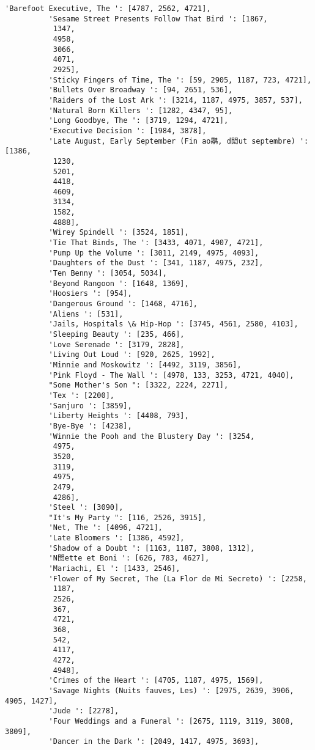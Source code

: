 \documentclass[11pt]{article}
\begin{document}
\begin{Verbatim}[commandchars=\\\{\}]
          'Barefoot Executive, The ': [4787, 2562, 4721],
          'Sesame Street Presents Follow That Bird ': [1867,
           1347,
           4958,
           3066,
           4071,
           2925],
          'Sticky Fingers of Time, The ': [59, 2905, 1187, 723, 4721],
          'Bullets Over Broadway ': [94, 2651, 536],
          'Raiders of the Lost Ark ': [3214, 1187, 4975, 3857, 537],
          'Natural Born Killers ': [1282, 4347, 95],
          'Long Goodbye, The ': [3719, 1294, 4721],
          'Executive Decision ': [1984, 3878],
          'Late August, Early September (Fin ao鹴, d閎ut septembre) ': [1386,
           1230,
           5201,
           4418,
           4609,
           3134,
           1582,
           4888],
          'Wirey Spindell ': [3524, 1851],
          'Tie That Binds, The ': [3433, 4071, 4907, 4721],
          'Pump Up the Volume ': [3011, 2149, 4975, 4093],
          'Daughters of the Dust ': [341, 1187, 4975, 232],
          'Ten Benny ': [3054, 5034],
          'Beyond Rangoon ': [1648, 1369],
          'Hoosiers ': [954],
          'Dangerous Ground ': [1468, 4716],
          'Aliens ': [531],
          'Jails, Hospitals \& Hip-Hop ': [3745, 4561, 2580, 4103],
          'Sleeping Beauty ': [235, 466],
          'Love Serenade ': [3179, 2828],
          'Living Out Loud ': [920, 2625, 1992],
          'Minnie and Moskowitz ': [4492, 3119, 3856],
          'Pink Floyd - The Wall ': [4978, 133, 3253, 4721, 4040],
          "Some Mother's Son ": [3322, 2224, 2271],
          'Tex ': [2200],
          'Sanjuro ': [3859],
          'Liberty Heights ': [4408, 793],
          'Bye-Bye ': [4238],
          'Winnie the Pooh and the Blustery Day ': [3254,
           4975,
           3520,
           3119,
           4975,
           2479,
           4286],
          'Steel ': [3090],
          "It's My Party ": [116, 2526, 3915],
          'Net, The ': [4096, 4721],
          'Late Bloomers ': [1386, 4592],
          'Shadow of a Doubt ': [1163, 1187, 3808, 1312],
          'N閚ette et Boni ': [626, 783, 4627],
          'Mariachi, El ': [1433, 2546],
          'Flower of My Secret, The (La Flor de Mi Secreto) ': [2258,
           1187,
           2526,
           367,
           4721,
           368,
           542,
           4117,
           4272,
           4948],
          'Crimes of the Heart ': [4705, 1187, 4975, 1569],
          'Savage Nights (Nuits fauves, Les) ': [2975, 2639, 3906, 4905, 1427],
          'Jude ': [2278],
          'Four Weddings and a Funeral ': [2675, 1119, 3119, 3808, 3809],
          'Dancer in the Dark ': [2049, 1417, 4975, 3693],

\end{Verbatim}
\end{document}
